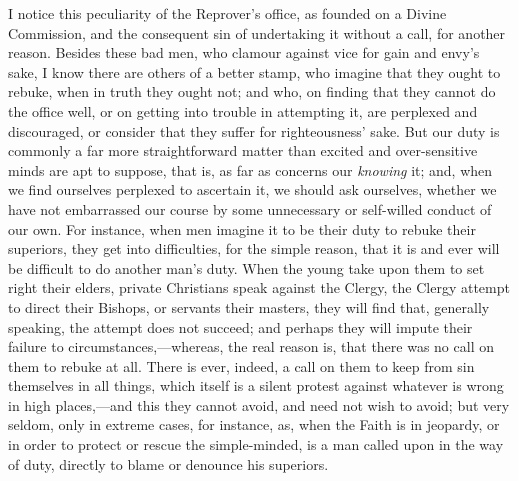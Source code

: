 I notice this peculiarity of the Reprover's office, as founded on a
Divine Commission, and the consequent sin of undertaking it without a
call, for another reason. Besides these bad men, who clamour against
vice for gain and envy's sake, I know there are others of a better
stamp, who imagine that they ought to rebuke, when in truth they ought
not; and who, on finding that they cannot do the office well, or on
getting into trouble in attempting it, are perplexed and discouraged, or
consider that they suffer for righteousness' sake. But our duty is
commonly a far more straightforward matter than excited and
over-sensitive minds are apt to suppose, that is, as far as concerns our
\emph{knowing} it; and, when we find ourselves perplexed to ascertain it, we
should ask ourselves, whether we have not embarrassed our course by some
unnecessary or self-willed conduct of our own. For instance, when men
imagine it to be their duty to rebuke their superiors, they get into
difficulties, for the simple reason, that it is and ever will be
difficult to do another man's duty. When the young take upon them to set
right their elders, private Christians speak against the Clergy, the
Clergy attempt to direct their Bishops, or servants their masters, they
will find that, generally speaking, the attempt does not succeed; and
perhaps they will impute their failure to circumstances,—whereas, the
real reason is, that there was no call on them to rebuke at all. There
is ever, indeed, a call on them to keep from sin themselves in all
things, which itself is a silent protest against whatever is wrong in
high places,—and this they cannot avoid, and need not wish to avoid;
but very seldom, only in extreme cases, for instance, as, when the Faith
is in jeopardy, or in order to protect or rescue the simple-minded, is a
man called upon in the way of duty, directly to blame or denounce his
superiors.

